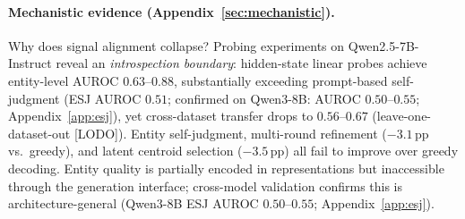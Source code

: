 \paragraph{Mechanistic evidence (Appendix~\ref{sec:mechanistic}).}
Why does signal alignment collapse? Probing experiments on Qwen2.5-7B-Instruct reveal an \textit{introspection boundary}: hidden-state linear probes achieve entity-level AUROC $0.63$--$0.88$, substantially exceeding prompt-based self-judgment (ESJ AUROC $0.51$; confirmed on Qwen3-8B: AUROC $0.50$--$0.55$; Appendix~\ref{app:esj}), yet cross-dataset transfer drops to $0.56$--$0.67$ (leave-one-dataset-out [LODO]).
Entity self-judgment, multi-round refinement ($-3.1$\,pp vs.\ greedy), and latent centroid selection ($-3.5$\,pp) all fail to improve over greedy decoding.
Entity quality is partially encoded in representations but inaccessible through the generation interface; cross-model validation confirms this is architecture-general (Qwen3-8B ESJ AUROC $0.50$--$0.55$; Appendix~\ref{app:esj}).
